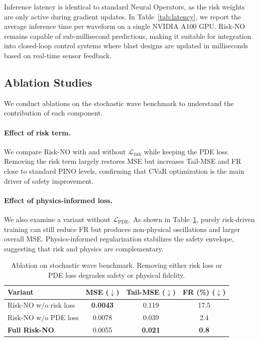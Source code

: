 \documentclass{article}
\newcommand{\Lrisk}{\mathcal{L}_{\text{risk}}}
\theoremstyle{plain}
\theoremstyle{definition}
\theoremstyle{remark}
\begin{document}
Inference latency is identical to standard Neural Operators, as the risk weights are only active during gradient updates. In Table~\ref{tab:latency}, we report the average inference time per waveform on a single NVIDIA A100 GPU. Risk-NO remains capable of sub-millisecond predictions, making it suitable for integration into closed-loop control systems where blast designs are updated in milliseconds based on real-time sensor feedback.

\subsection{Ablation Studies}

We conduct ablations on the stochastic wave benchmark to understand the contribution of each component.

\paragraph{Effect of risk term.}
We compare Risk-NO with and without $\Lrisk$ while keeping the PDE loss. Removing the risk term largely restores MSE but increases Tail-MSE and FR close to standard PINO levels, confirming that CVaR optimization is the main driver of safety improvement.

\paragraph{Effect of physics-informed loss.}
We also examine a variant without $\mathcal{L}_{\text{PDE}}$. As shown in Table~\ref{tab:ablation}, purely risk-driven training can still reduce FR but produces non-physical oscillations and larger overall MSE. Physics-informed regularization stabilizes the safety envelope, suggesting that risk and physics are complementary.


\begin{table}[t]
    \centering
    \caption{Ablation on stochastic wave benchmark. Removing either risk loss or PDE loss degrades safety or physical fidelity.}
    \label{tab:ablation}
    \begin{tabularx}{\columnwidth}{Xccc}
        \toprule
        Variant & MSE ($\downarrow$) & Tail-MSE ($\downarrow$) & FR (\%) ($\downarrow$) \\
        \midrule
        Risk-NO w/o risk loss & \textbf{0.0043} & 0.119 & 17.5 \\
        Risk-NO w/o PDE loss  & 0.0078 & 0.039 &  2.4 \\
        \textbf{Full Risk-NO} & 0.0055 & \textbf{0.021} & \textbf{0.8} \\
        \bottomrule
    \end{tabularx}
\end{table}
\end{document}
